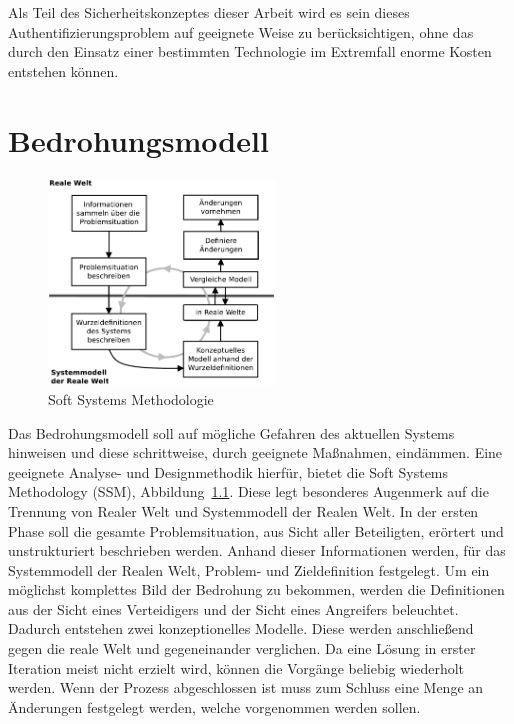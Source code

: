 \documentclass[11pt,a4paper]{report}
\begin{document}
Als Teil des Sicherheitskonzeptes dieser Arbeit wird es sein dieses Authentifizierungsproblem auf geeignete Weise zu berücksichtigen, ohne das durch den Einsatz einer bestimmten Technologie im Extremfall enorme Kosten entstehen können. 


\chapter{Bedrohungsmodell} \label{chap:threat}

\begin{figure}
\centering
\includegraphics[width=6cm]{images/ssm.pdf}
\caption{Soft Systems Methodologie}
\label{fig:ssm}
\end{figure}

Das Bedrohungsmodell soll auf mögliche Gefahren des aktuellen Systems hinweisen und diese schrittweise, durch geeignete Maßnahmen, eindämmen. Eine geeignete Analyse- und Designmethodik hierfür, bietet die Soft Systems Methodology (SSM), Abbildung~\ref{fig:ssm}. Diese legt besonderes Augenmerk auf die Trennung von Realer Welt und Systemmodell der Realen Welt. In der ersten Phase soll die gesamte Problemsituation, aus Sicht aller Beteiligten, erörtert und unstrukturiert beschrieben werden. Anhand dieser Informationen werden, für das Systemmodell der Realen Welt, Problem- und Zieldefinition festgelegt. Um ein möglichst komplettes Bild der Bedrohung zu bekommen, werden die Definitionen aus der Sicht eines Verteidigers und der Sicht eines Angreifers beleuchtet. Dadurch entstehen zwei konzeptionelles Modelle. Diese werden anschließend gegen die reale Welt und gegeneinander verglichen. Da eine Lösung in erster Iteration meist nicht erzielt wird, können die Vorgänge beliebig wiederholt werden. Wenn der Prozess abgeschlossen ist muss zum Schluss eine Menge an Änderungen festgelegt werden, welche vorgenommen werden sollen.
\end{document}
